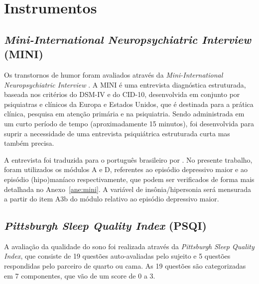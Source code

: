 \documentclass[chapter=TITLE,
               oneside,
               12pt,
               a4paper,
               english,
               brazil]{abntex2}    %
\begin{document}
    \section{Instrumentos}\label{sec:instrumentos}
    
        \subsection{\textit{Mini-International Neuropsychiatric Interview} (MINI)}
        \label{sec:mini}
    
            Os transtornos de humor foram avaliados através da
            \textit{Mini-International Neuropsychiatric Interview}
            \parencite{sheehan_mini-international_1998}.
            A MINI é uma entrevista diagnóstica estruturada,
            baseada nos critérios do DSM-IV e do CID-10,
            desenvolvida em conjunto por psiquiatras e clínicos
            da Europa e Estados Unidos,
            que é destinada para a prática clínica, pesquisa em atenção primária
            e na psiquiatria.
            Sendo administrada em um curto período de tempo (aproximadamente 15 minutos),
            foi desenvolvida para suprir a necessidade de uma entrevista psiquiátrica
            estruturada curta mas também precisa.
    
            A entrevista foi traduzida para o português brasileiro por
            \textcite{amorim_mini_2000}.
            No presente trabalho, foram utilizados os módulos A e D, referentes
            ao episódio depressivo maior e ao episódio (hipo)maníaco respectivamente,
            que podem ser verificados de forma mais detalhada no Anexo~\ref{ane:mini}.
            A variável de insônia/hipersonia será mensurada a partir do item A3b do
            módulo relativo ao episódio depressivo maior. 
    
        \subsection{\textit{Pittsburgh Sleep Quality Index} (PSQI)}
        \label{sec:psqi}
    
            A avaliação da qualidade do sono foi realizada através da
            \textit{Pittsburgh Sleep Quality Index}, que consiste de 19 questões
            auto-avaliadas pelo sujeito e 5 questões respondidas pelo parceiro de
            quarto ou cama. 
            As 19 questões são categorizadas em 7 componentes, que vão de um score
            de 0 a 3.
            \parencite{bertolazi_validation_2011}
    
\end{document}
